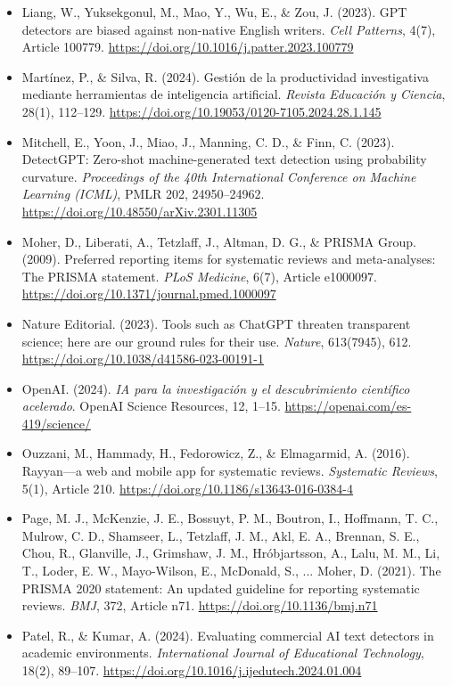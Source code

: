 \begin{itemize}[leftmargin=1.5em, label={}, itemsep=0.22ex, parsep=0pt]
    \item Liang, W., Yuksekgonul, M., Mao, Y., Wu, E., \& Zou, J. (2023). GPT detectors are biased against non-native English writers. \textit{Cell Patterns}, 4(7), Article 100779. \url{https://doi.org/10.1016/j.patter.2023.100779}
    \item Martínez, P., \& Silva, R. (2024). Gestión de la productividad investigativa mediante herramientas de inteligencia artificial. \textit{Revista Educación y Ciencia}, 28(1), 112--129. \url{https://doi.org/10.19053/0120-7105.2024.28.1.145}
    \item Mitchell, E., Yoon, J., Miao, J., Manning, C. D., \& Finn, C. (2023). DetectGPT: Zero-shot machine-generated text detection using probability curvature. \textit{Proceedings of the 40th International Conference on Machine Learning (ICML)}, PMLR 202, 24950--24962. \url{https://doi.org/10.48550/arXiv.2301.11305}
    \item Moher, D., Liberati, A., Tetzlaff, J., Altman, D. G., \& PRISMA Group. (2009). Preferred reporting items for systematic reviews and meta-analyses: The PRISMA statement. \textit{PLoS Medicine}, 6(7), Article e1000097. \url{https://doi.org/10.1371/journal.pmed.1000097}
    \item Nature Editorial. (2023). Tools such as ChatGPT threaten transparent science; here are our ground rules for their use. \textit{Nature}, 613(7945), 612. \url{https://doi.org/10.1038/d41586-023-00191-1}
    \item OpenAI. (2024). \textit{IA para la investigación y el descubrimiento científico acelerado}. OpenAI Science Resources, 12, 1--15. \url{https://openai.com/es-419/science/}
    \item Ouzzani, M., Hammady, H., Fedorowicz, Z., \& Elmagarmid, A. (2016). Rayyan---a web and mobile app for systematic reviews. \textit{Systematic Reviews}, 5(1), Article 210. \url{https://doi.org/10.1186/s13643-016-0384-4}
    \item Page, M. J., McKenzie, J. E., Bossuyt, P. M., Boutron, I., Hoffmann, T. C., Mulrow, C. D., Shamseer, L., Tetzlaff, J. M., Akl, E. A., Brennan, S. E., Chou, R., Glanville, J., Grimshaw, J. M., Hróbjartsson, A., Lalu, M. M., Li, T., Loder, E. W., Mayo-Wilson, E., McDonald, S., ... Moher, D. (2021). The PRISMA 2020 statement: An updated guideline for reporting systematic reviews. \textit{BMJ}, 372, Article n71. \url{https://doi.org/10.1136/bmj.n71}
    \item Patel, R., \& Kumar, A. (2024). Evaluating commercial AI text detectors in academic environments. \textit{International Journal of Educational Technology}, 18(2), 89--107. \url{https://doi.org/10.1016/j.ijedutech.2024.01.004}

\end{itemize}
